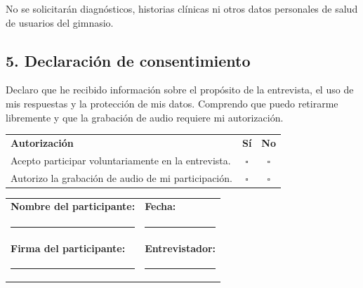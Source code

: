 \documentclass[10pt,letterpaper]{article}
\begin{document}
No se solicitarán diagnósticos, historias clínicas ni otros datos personales de salud de usuarios del gimnasio.

\subsection*{\textcolor{azul}{5. Declaración de consentimiento}}

Declaro que he recibido información sobre el propósito de la entrevista, el uso de mis respuestas y la protección de mis datos. Comprendo que puedo retirarme libremente y que la grabación de audio requiere mi autorización.

\begin{tabularx}{\linewidth}{@{}Xcc@{}}
\rowcolor{palido}
\textbf{Autorización} & \textbf{Sí} & \textbf{No}\\
Acepto participar voluntariamente en la entrevista. & $\square$ & $\square$\\
Autorizo la grabación de audio de mi participación. & $\square$ & $\square$\\
\end{tabularx}

\vspace{10pt}

\begin{tabularx}{\linewidth}{@{}X X@{}}
\textbf{Nombre del participante:} & \textbf{Fecha:}\\[16pt]
\rule{6.4cm}{0.4pt} & \rule{5cm}{0.4pt}\\[10pt]
\textbf{Firma del participante:} & \textbf{Entrevistador:}\\[16pt]
\rule{6.4cm}{0.4pt} & \rule{5cm}{0.4pt}\\
\end{tabularx}

\endgroup
\end{document}
